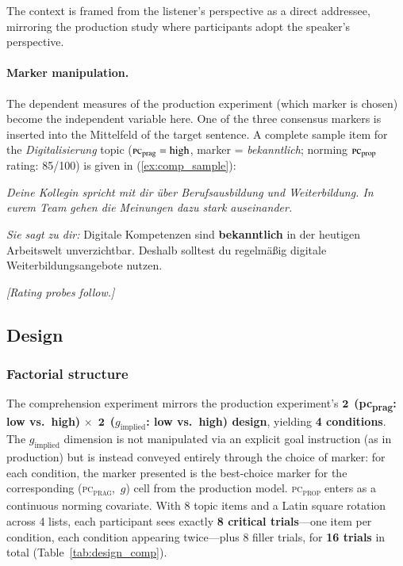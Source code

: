 \documentclass[12pt]{article}
\begin{document}
The context is framed from the listener's perspective as a direct addressee,
mirroring the production study where participants adopt the speaker's
perspective.

\paragraph{Marker manipulation.}
The dependent measures of the production experiment (which marker is chosen)
become the independent variable here.
One of the three consensus markers is inserted into the Mittelfeld of the
target sentence.
A complete sample item for the \textit{Digitalisierung} topic
($\textsc{pc}_\text{prag} = \text{high}$, marker = \textit{bekanntlich};
norming $\textsc{pc}_\text{prop}$ rating: 85/100) is given in
(\ref{ex:comp_sample}):

\begin{exe}
  \ex \label{ex:comp_sample}
  \textit{Deine Kollegin spricht mit dir \"uber Berufsausbildung und
  Weiterbildung.
  In eurem Team gehen die Meinungen dazu stark auseinander.}

  \textit{Sie sagt zu dir:} Digitale Kompetenzen sind \textbf{bekanntlich}
  in der heutigen Arbeitswelt unverzichtbar.
  Deshalb solltest du regelm\"a\ss{}ig digitale Weiterbildungsangebote nutzen.

  \noindent\textit{[Rating probes follow.]}
\end{exe}

\subsection{Design}

\subsubsection{Factorial structure}

The comprehension experiment mirrors the production experiment's
$\mathbf{2}$~\textbf{(pc\textsubscript{prag}: low vs.\ high)}
$\mathbf{\times}$~$\mathbf{2}$~\textbf{($g_{\mathrm{implied}}$: low
vs.\ high) design}, yielding \textbf{4 conditions}.
The $g_{\mathrm{implied}}$ dimension is not manipulated via an explicit
goal instruction (as in production) but is instead conveyed entirely
through the choice of marker: for each condition, the marker presented
is the best-choice marker for the corresponding
(\textsc{pc\textsubscript{prag}},~$g$) cell from the production model.
\textsc{pc\textsubscript{prop}} enters as a continuous norming covariate.
With 8 topic items and a Latin square rotation across 4 lists, each
participant sees exactly \textbf{8 critical trials}---one item per
condition, each condition appearing twice---plus 8 filler trials,
for \textbf{16 trials} in total (Table~\ref{tab:design_comp}).
\end{document}
